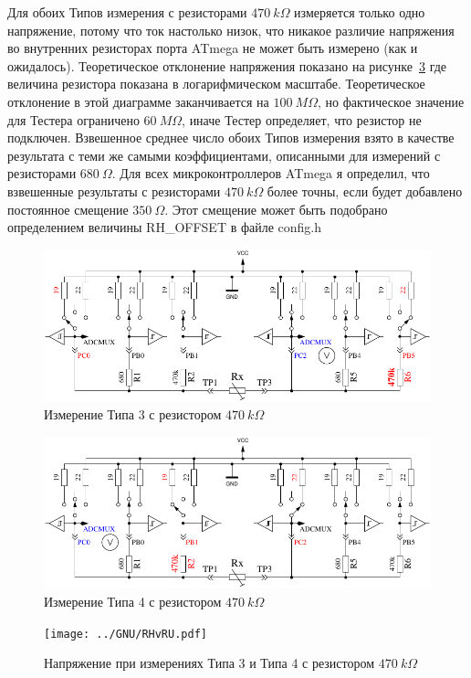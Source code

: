 Для обоих Типов измерения с резисторами \(470~k\Omega\) измеряется только одно напряжение, потому что ток настолько 
низок, что никакое различие напряжения во внутренних резисторах порта ATmega не может быть измерено (как и 
ожидалось). Теоретическое отклонение напряжения показано на рисунке~\ref{fig:RHv} где величина резистора показана 
в логарифмическом масштабе. Теоретическое отклонение в этой диаграмме заканчивается на \(100~M\Omega\), но 
фактическое значение для Тестера ограничено \(60~M\Omega\), иначе Тестер определяет, что резистор не подключен. 
Взвешенное среднее число обоих Типов измерения взято в качестве результата с теми же самыми коэффициентами, 
описанными для измерений с резисторами \(680~\Omega\).
Для всех микроконтроллеров ATmega я определил, что взвешенные результаты с резисторами \(470~k\Omega\) более точны, 
если будет добавлено постоянное смещение \(350~\Omega\).
Этот смещение может быть подобрано определением величины RH\_OFFSET в файле config.h

\begin{figure}[H]
\centering
\includegraphics[width=.8\textwidth]{../FIG/ResistormessH1.pdf}
\caption{Измерение Типа 3 с резистором \(470~k\Omega\) }
\label{fig:RH1mes}
\end{figure}

\begin{figure}[H]
 \centering
 \includegraphics[width=.8\textwidth]{../FIG/ResistormessH2.pdf}
 \caption{Измерение Типа 4 с резистором \(470~k\Omega\) }
\label{fig:RH2mes}
\end{figure}

\begin{figure}[H]
\centering
\texttt{[image: ../GNU/RHvRU.pdf]}
\caption{Напряжение при измерениях Типа 3 и Типа 4 с резистором \(470~k\Omega\) }
\label{fig:RHv}
\end{figure}

